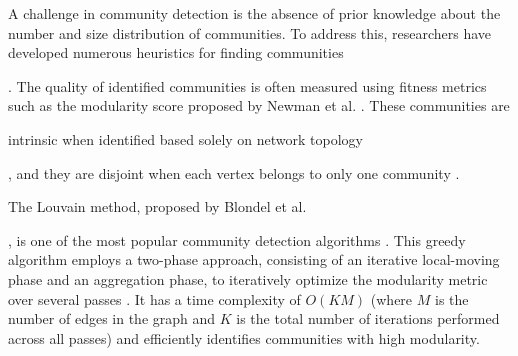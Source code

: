 A challenge in community detection is the absence of prior knowledge about the number and size distribution of communities. To address this, researchers have developed numerous heuristics for finding communities \cite{com-blondel08, com-gregory10}. The quality of identified communities is often measured using fitness metrics such as the modularity score proposed by Newman et al. \cite{com-newman04}. These communities are intrinsic when identified based solely on network topology, and they are disjoint when each vertex belongs to only one community \cite{com-gregory10}.

The Louvain method, proposed by Blondel et al. \cite{com-blondel08}, is one of the most popular community detection algorithms \cite{com-lancichinetti09}. This greedy algorithm employs a two-phase approach, consisting of an iterative local-moving phase and an aggregation phase, to iteratively optimize the modularity metric over several passes \cite{com-blondel08}. It has a time complexity of $O(KM)$ (where $M$ is the number of edges in the graph and $K$ is the total number of iterations performed across all passes) and efficiently identifies communities with high modularity.

